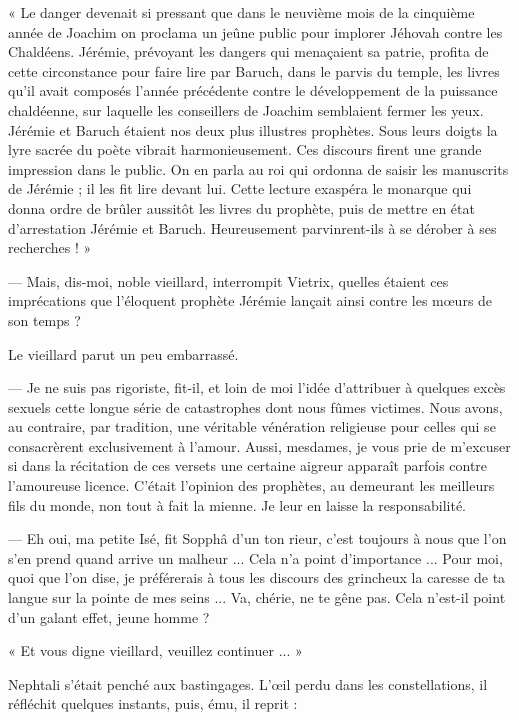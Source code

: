 \documentclass[a4paper, 11pt, oneside, polutonikogreek, french]{article}
\begin{document}
« Le danger devenait si pressant que dans le neuvième mois de la cinquième année de Joachim on proclama un jeûne public pour implorer Jéhovah contre les Chaldéens. Jérémie, prévoyant les dangers qui menaçaient sa patrie, profita de cette circonstance pour faire lire par Baruch, dans le parvis du temple, les livres qu'il avait composés l'année précédente contre le développement de la puissance chaldéenne, sur laquelle les conseillers de Joachim semblaient fermer les yeux. Jérémie et Baruch étaient nos deux plus illustres prophètes. Sous leurs doigts la lyre sacrée du poète vibrait harmonieusement. Ces discours firent une grande impression dans le public. On en parla au roi qui ordonna de saisir les manuscrits de Jérémie ; il les fit lire devant lui. Cette lecture exaspéra le monarque qui donna ordre de brûler aussitôt les livres du prophète, puis de mettre en état d'arrestation Jérémie et Baruch. Heureusement parvinrent-ils à se dérober à ses recherches ! »

\bigskip
\centerline{\EightStarTaper}
\centerline{\EightStarTaper\EightStarTaper}
\bigskip

--- Mais, dis-moi, noble vieillard, interrompit Vietrix, quelles étaient ces imprécations que l'éloquent prophète Jérémie lançait ainsi contre les mœurs de son temps ?

Le vieillard parut un peu embarrassé.

--- Je ne suis pas rigoriste, fit-il, et loin de moi l'idée d'attribuer à quelques excès sexuels cette longue série de catastrophes dont nous fûmes victimes. Nous avons, au contraire, par tradition, une véritable vénération religieuse pour celles qui se consacrèrent exclusivement à l'amour. Aussi, mesdames, je vous prie de m'excuser si dans la récitation de ces versets une certaine aigreur apparaît parfois contre l'amoureuse licence. C'était l'opinion des prophètes, au demeurant les meilleurs fils du monde, non tout à fait la mienne. Je leur en laisse la responsabilité.

--- Eh oui, ma petite Isé, fit Sopphâ d'un ton rieur, c'est toujours à nous que l'on s'en prend quand arrive un malheur ... Cela n'a point d'importance ... Pour moi, quoi que l'on dise, je préférerais à tous les discours des grincheux la caresse de ta langue sur la pointe de mes seins ... Va, chérie, ne te gêne pas. Cela n'est-il point d'un galant effet, jeune homme ?

« Et vous digne vieillard, veuillez continuer ... »

Nephtali s'était penché aux bastingages. L'œil perdu dans les constellations, il réfléchit quelques instants, puis, ému, il reprit :
\end{document}
